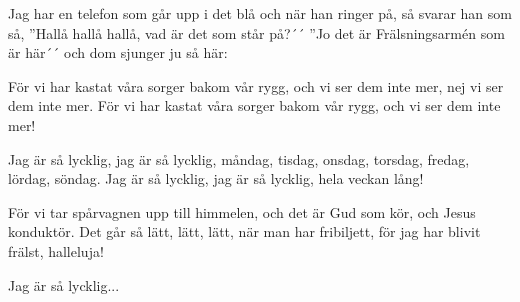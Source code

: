 \vspace{10pt}
Jag har en telefon
som går upp i det blå
och när han ringer på,
så svarar han som så,
''Hallå hallå hallå, vad är det som står på?´´
''Jo det är Frälsningsarmén som är här´´
och dom sjunger ju så här:

För vi har kastat våra sorger bakom vår rygg,
och vi ser dem inte mer,
nej vi ser dem inte mer.
För vi har kastat våra sorger bakom vår rygg,
och vi ser dem inte mer!

Jag är så lycklig, jag är så lycklig,
måndag, tisdag, onsdag, torsdag,
fredag, lördag, söndag.
Jag är så lycklig, jag är så lycklig,
hela veckan lång!

För vi tar spårvagnen upp till himmelen,
och det är Gud som kör, och Jesus konduktör.
Det går så lätt, lätt, lätt,
när man har fribiljett,
för jag har blivit frälst, halleluja!

Jag är så lycklig...
